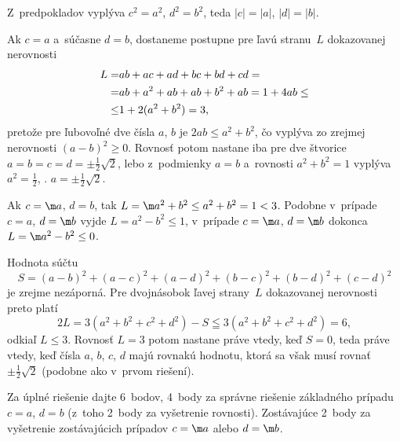 {%
Z~predpokladov vyplýva $c^{2} = a^{2}$, $d^{2} =b^{2}$, teda
$|c|=|a|$, $|d|=|b|$.

Ak $c = a$ a~súčasne $d = b$, dostaneme postupne pre ľavú
stranu~$L$ dokazovanej nerovnosti
$$
\aligned
L=& ab + ac + ad + bc + bd + cd=\\
 =& ab + a^{2} + ab + ab + b^{2} + ab = 1 + 4ab\le\\
\le& 1 + 2(a^{2} + b^{2}) = 3,
\endaligned
$$
pretože pre ľubovoľné dve čísla $a$, $b$ je $2ab\le a^{2} + b^{2}$,
čo vyplýva zo zrejmej nerovnosti $(a-b)^2\ge0$. Rovnosť potom nastane
iba pre dve štvorice $a=b=c=d=\pm\frac12\sqrt2$, lebo 
z~podmienky $a=b$ a~rovnosti $a^2+b^2=1$ vyplýva $a^2=\frac12$, \tj.
$a=\pm\frac12\sqrt2$.

Ak $c=\m a$, $d=b$, tak $L =\m a^{2}+b^{2}\le a^{2} + b^{2} =
1<3$. Podobne v~prípade $c=a$, $d=\m b$ vyjde $L=a^2-b^2\le1$, 
v~prípade $c=\m a$, $d=\m b$ dokonca $L=\m a^2-b^2\le0$.

\ineriesenie
Hodnota súčtu
$$
S=(a-b)^2+(a-c)^2+(a-d)^2+(b-c)^2+(b-d)^2+(c-d)^2
$$
je zrejme nezáporná. Pre dvojnásobok ľavej strany~$L$ dokazovanej
nerovnosti preto platí
$$
2L=3(a^2+b^2+c^2+d^2)-S\leqq3(a^2+b^2+c^2+d^2)=6,
$$
odkiaľ $L\le3$. Rovnosť $L=3$ potom nastane práve vtedy, keď $S=0$,
teda práve vtedy, keď čísla $a$, $b$, $c$, $d$ majú rovnakú hodnotu,
ktorá sa však musí rovnať $\pm\frac12\sqrt2$ (podobne ako v~prvom
riešení).

\nobreak\medskip\petit\noindent
Za úplné riešenie dajte 6~bodov, 4~body za správne riešenie
základného prípadu $c=a$, $d=b$ (z~toho 2~body za vyšetrenie
rovnosti). Zostávajúce 2~body za vyšetrenie zostávajúcich prípadov
$c=\m a$ alebo $d=\m b$.
\endpetit
\bigbreak}

